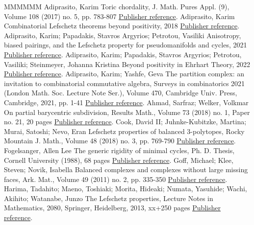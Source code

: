\begin{thebibliography}{MMMMMM}
 Adiprasito, Karim Toric chordality, J. Math. Pures Appl. (9), Volume 108 (2017) no. 5, pp. 783-807 \href{https://alco.centre-mersenne.org/articles/10.5802/alco.419/#Adi17}{Publisher reference}.
 Adiprasito, Karim Combinatorial Lefschetz theorems beyond positivity, 2018 \href{https://alco.centre-mersenne.org/articles/10.5802/alco.419/#Adi}{Publisher reference}.
 Adiprasito, Karim; Papadakis, Stavros Argyrios; Petrotou, Vasiliki Anisotropy, biased pairings, and the Lefschetz property for pseudomanifolds and cycles, 2021 \href{https://alco.centre-mersenne.org/articles/10.5802/alco.419/#APP}{Publisher reference}.
 Adiprasito, Karim; Papadakis, Stavros Argyrios; Petrotou, Vasiliki; Steinmeyer, Johanna Kristina Beyond positivity in Ehrhart Theory, 2022 \href{https://alco.centre-mersenne.org/articles/10.5802/alco.419/#APPS}{Publisher reference}.
 Adiprasito, Karim; Yashfe, Geva The partition complex: an invitation to combinatorial commutative algebra, Surveys in combinatorics 2021 (London Math. Soc. Lecture Note Ser.), Volume 470, Cambridge Univ. Press, Cambridge, 2021, pp. 1-41 \href{https://alco.centre-mersenne.org/articles/10.5802/alco.419/#AY}{Publisher reference}.
 Ahmad, Sarfraz; Welker, Volkmar On partial barycentric subdivision, Results Math., Volume 73 (2018) no. 1, Paper no. 21, 20 pages \href{https://alco.centre-mersenne.org/articles/10.5802/alco.419/#AW}{Publisher reference}.
 Cook, David II; Juhnke-Kubitzke, Martina; Murai, Satoshi; Nevo, Eran Lefschetz properties of balanced 3-polytopes, Rocky Mountain J. Math., Volume 48 (2018) no. 3, pp. 769-790 \href{https://alco.centre-mersenne.org/articles/10.5802/alco.419/#CJMN}{Publisher reference}.
 Fogelsanger, Allen Lee The generic rigidity of minimal cycles, Ph. D. Thesis, Cornell University (1988), 68 pages \href{https://alco.centre-mersenne.org/articles/10.5802/alco.419/#Fog}{Publisher reference}.
 Goff, Michael; Klee, Steven; Novik, Isabella Balanced complexes and complexes without large missing faces, Ark. Mat., Volume 49 (2011) no. 2, pp. 335-350 \href{https://alco.centre-mersenne.org/articles/10.5802/alco.419/#GKN}{Publisher reference}.
 Harima, Tadahito; Maeno, Toshiaki; Morita, Hideaki; Numata, Yasuhide; Wachi, Akihito; Watanabe, Junzo The Lefschetz properties, Lecture Notes in Mathematics, 2080, Springer, Heidelberg, 2013, xx+250 pages \href{https://alco.centre-mersenne.org/articles/10.5802/alco.419/#HMMNWW}{Publisher reference}.

\end{thebibliography}
